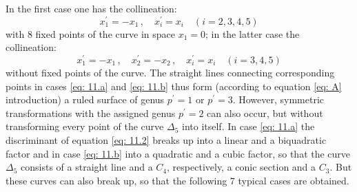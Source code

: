 \documentclass[leqno]{article}
\begin{document}
In the first case one has the collineation: 
\begin{equation}\label{eq: 11.alpha}
x_1^\prime = -x_1 \, , \quad x_i^\prime = x_i \quad (i=2,3,4,5) \tag{$\alpha$}
\end{equation} 
with 8 fixed points of the curve in space $x_1=0$; in the latter case the collineation: 
\begin{equation}\label{eq: 11.beta}
x_1^\prime = -x_1 \, , \quad x_2^\prime = -x_2 \, , \quad x_i^\prime = x_i \quad (i=3,4,5) \tag{$\beta$}
\end{equation} 
without fixed points of the curve. The straight lines connecting corresponding points in cases \eqref{eq: 11.a} and \eqref{eq: 11.b} thus form (according to equation \eqref{eq: A} introduction) a ruled surface of genus $p^\prime=1$ or $p^\prime=3$. However, symmetric transformations with the assigned genus $p^\prime=2$ can also occur, but without transforming every point of the curve $\Delta_5$ into itself. In case \eqref{eq: 11.a} the discriminant of equation \eqref{eq: 11.2} breaks up into a linear and a biquadratic factor and in case \eqref{eq: 11.b} into a quadratic and a cubic factor, so that the curve $\Delta_5$ consists of a straight line and a $C_4$, respectively, a conic section and a $C_3$. But these curves can also break up, so that the following 7 typical cases are obtained.
\end{document}

